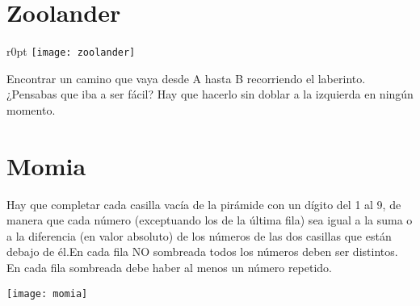 \documentclass[12pt, a4paper]{article}
\begin{document}
\section*{Zoolander}
\begin{wrapfigure}{r}{0pt}
\vspace{-2.3em}
\texttt{[image: zoolander]}
\end{wrapfigure}

Encontrar un camino que vaya desde A hasta B recorriendo el laberinto.
¿Pensabas que iba a ser fácil? Hay que hacerlo sin doblar a la izquierda
en ningún momento.


\section*{Momia}

Hay que completar cada casilla vacía de la pirámide con un dígito del 1 al 9,
de manera que cada número (exceptuando los de la última fila) sea igual a la suma
o a la diferencia (en valor absoluto) de los números de las dos casillas que
están debajo de él.En cada fila NO sombreada todos los números deben ser distintos.
En cada fila sombreada debe haber al menos un número repetido.

\begin{centering}
\texttt{[image: momia]}
\end{centering}

\end{document}

